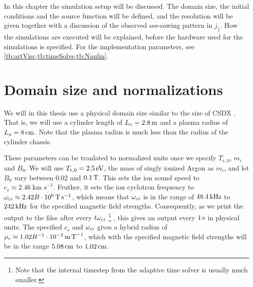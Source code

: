 In this chapter the simulation setup will be discussed.
The domain size, the initial conditions and the source function will be defined, and the resolution will be given together with a discussion of the observed see-sawing pattern in $j_\|$.
How the simulations are executed will be explained, before the hardware used for the simulations is specified.
For the implementation parameters, see \cref{tb:artVisc,tb:timeSolve,tb:Naulin}.

\section{Domain size and normalizations}
%
We will in this thesis use a physical domain size similar to the size of CSDX \cite{Tynan2004a}.
That is, we will use a cylinder length of $L_z=2.8\, \text{m}$ and a plasma radius of $L_\rho=8\, \text{cm}$.
Note that the plasma radius is much less than the radius of the cylinder chassis.

These parameters can be tranlated to normalized units once we specify $T_{e,0}$, $m_i$ and $B_0$.
We will use $T_{e,0} = 2.5\, \text{eV}$, the mass of singly ionized Argon as $m_i$, and let $B_0$ vary between $0.02$ and $0.1 \, \text{T}$.
This sets the ion sound speed to $c_s \approx 2.46\; \text{km s}^{-1}$.
Fruther, it sets the ion cyclotron frequency to $\omega_{ci}\approx 2.42 B \cdot 10^6 \, \text{T}\, \text{s}^{-1}$, which means that $\omega_{ci}$ is in the range of $48.4\, \text{kHz}$ to $242\, \text{kHz}$ for the specified magnetic field strengths.
Consequently, as we print the output to the files after every $t\omega_{ci}$ %
\footnote{Note that the internal timestep from the adaptive time solver is usually much smaller.}%
%
, this gives an output every $1\, \text{s}$ in physical units.
The specified $c_s$ and $\omega_{ci}$ gives a hybrid radius of $\rho_s \approx 1.02B^{-1}\cdot10^{-3}\, \text{m}\, \text{T}^{-1}$, which with the specified magnetic field strengths will be in the range $5.08\, \text{cm}$ to $1.02\, \text{cm}$.

